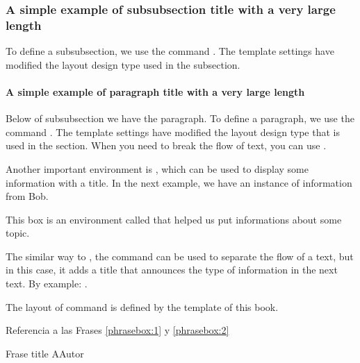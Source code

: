 \subsubsection{A simple example of subsubsection title with a very large length}

To define a subsubsection, we use the command  . 
The template settings have modified the layout design type used in the subsection.

\paragraph{A simple example of paragraph title with a very large length}

Below of subsubsection we have the paragraph.
To define a paragraph, we use the command . 
The template settings have modified the layout design type that is used in the section.
When you need to break the flow of text, you can use .

\OrnamentalBreak

Another important environment is 
, 
which can be used to display some information with a title.
In the next example, we have an instance of information from Bob.

\begin{informationbox}[Título A]
\label{informationbox:1}
This box is an environment called  that helped us put informations about some topic.
\end{informationbox}

The similar way to , 
the  command can be used to separate 
the flow of a text, but in this case, 
it adds a title that announces the type of information in the next text.
By example:  .

%

The layout of  command is 
defined by the template of this book.

Referencia a las Frases \ref{phrasebox:1} y \ref{phrasebox:2} 

\begin{phrasebox}{Frase title A}{Autor}
\label{phrasebox:1}
\lipsum[1][1-2] 
\end{phrasebox}


